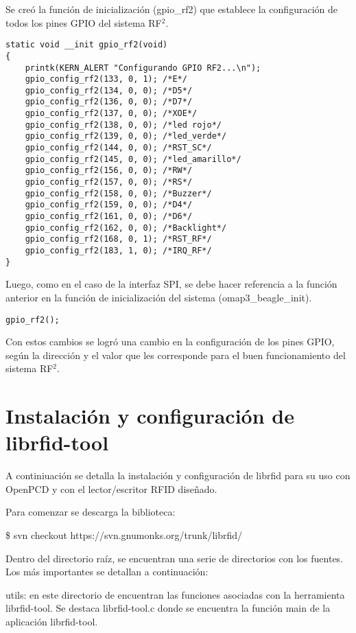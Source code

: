 Se creó la función de inicialización (gpio\_rf2) que establece la configuración de todos los pines GPIO del sistema RF$^{2}$.

\begin{verbatim}
static void __init gpio_rf2(void)
{
    printk(KERN_ALERT "Configurando GPIO RF2...\n");
    gpio_config_rf2(133, 0, 1); /*E*/
    gpio_config_rf2(134, 0, 0); /*D5*/
    gpio_config_rf2(136, 0, 0); /*D7*/
    gpio_config_rf2(137, 0, 0); /*XOE*/
    gpio_config_rf2(138, 0, 0); /*led rojo*/
    gpio_config_rf2(139, 0, 0); /*led_verde*/
    gpio_config_rf2(144, 0, 0); /*RST_SC*/
    gpio_config_rf2(145, 0, 0); /*led_amarillo*/
    gpio_config_rf2(156, 0, 0); /*RW*/
    gpio_config_rf2(157, 0, 0); /*RS*/
    gpio_config_rf2(158, 0, 0); /*Buzzer*/
    gpio_config_rf2(159, 0, 0); /*D4*/
    gpio_config_rf2(161, 0, 0); /*D6*/
    gpio_config_rf2(162, 0, 0); /*Backlight*/
    gpio_config_rf2(168, 0, 1); /*RST_RF*/
    gpio_config_rf2(183, 1, 0); /*IRQ_RF*/
}
\end{verbatim}

Luego, como en el caso de la interfaz SPI, se debe hacer referencia a la función anterior en la función de inicialización del sistema (omap3\_beagle\_init).

\begin{verbatim}
gpio_rf2();
\end{verbatim}

Con estos cambios se logró una cambio en la configuración de los pines GPIO, según la dirección y el valor que les corresponde para el buen funcionamiento del sistema RF$^{2}$.


\section{Instalación y configuración de librfid-tool}\label{ins_conf_librfid}

A continiuación se detalla la instalación y configuración de librfid para su uso con OpenPCD y con el lector/escritor RFID diseñado.

\bigskip
Para comenzar se descarga la biblioteca:

\bigskip
\centerline{\$ svn checkout https://svn.gnumonks.org/trunk/librfid/}

\bigskip
Dentro del directorio raíz, se encuentran una serie de directorios con los fuentes. Los más importantes se detallan a continuación:

\bigskip
utils: en este directorio de encuentran las funciones asociadas con la herramienta librfid-tool. Se destaca librfid-tool.c donde se encuentra la función main de la aplicación librfid-tool.

